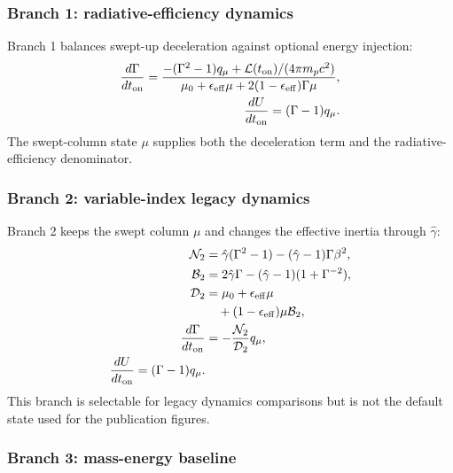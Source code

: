 \documentclass[twocolumn]{aastex702}
\begin{document}
\subsubsection{Branch 1: radiative-efficiency dynamics}

Branch 1 balances swept-up deceleration against optional energy injection:
\begin{equation}
\begin{aligned}
\frac{d\Gamma}{dt_{\rm on}}=
\frac{-(\Gamma^2-1)q_\mu
+\mathcal{L}(t_{\rm on})/(4\pi m_pc^2)}
{\mu_0+\epsilon_{\rm eff}\mu
+2(1-\epsilon_{\rm eff})\Gamma\mu},
\\
\frac{dU}{dt_{\rm on}}=(\Gamma-1)q_\mu .
\end{aligned}
\end{equation}
The swept-column state \(\mu\) supplies both the deceleration term and the
radiative-efficiency denominator.

\subsubsection{Branch 2: variable-index legacy dynamics}

Branch 2 keeps the swept column \(\mu\) and changes the effective inertia through
\(\hat{\gamma}\):
\begin{equation}
\begin{aligned}
\mathcal{N}_2&=
\hat{\gamma}(\Gamma^2-1)-(\hat{\gamma}-1)\Gamma\beta^2,\\
\mathcal{B}_2&=
2\hat{\gamma}\Gamma-(\hat{\gamma}-1)(1+\Gamma^{-2}),\\
\mathcal{D}_2&=\mu_0+\epsilon_{\rm eff}\mu\\
&\quad +(1-\epsilon_{\rm eff})\mu\mathcal{B}_2,\\
\frac{d\Gamma}{dt_{\rm on}}&=-
\frac{\mathcal{N}_2}{\mathcal{D}_2}q_\mu,\\
\frac{dU}{dt_{\rm on}}=(\Gamma-1)q_\mu .
\end{aligned}
\end{equation}
This branch is selectable for legacy dynamics comparisons but is not the default
state used for the publication figures.

\subsubsection{Branch 3: mass-energy baseline}
\end{document}

